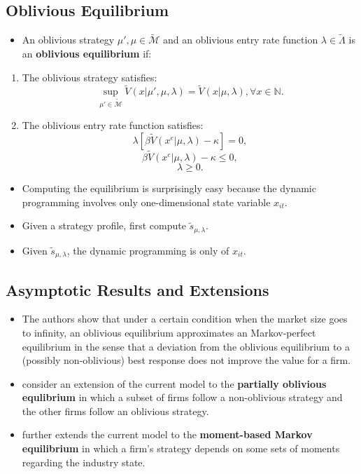 \documentclass[
]{book}
\providecommand{\tightlist}{%
  \setlength{\itemsep}{0pt}\setlength{\parskip}{0pt}}
\begin{document}
\hypertarget{oblivious-equilibrium}{%
\subsection{Oblivious Equilibrium}\label{oblivious-equilibrium}}

\begin{itemize}
\tightlist
\item
  An oblivious strategy \(\mu', \mu \in \widetilde{\mathcal{M}}\) and an oblivious entry rate function \(\lambda \in \widetilde{\Lambda}\) is an \textbf{oblivious equilibrium} if:
\end{itemize}

\begin{enumerate}
\def\labelenumi{\arabic{enumi}.}
\tightlist
\item
  The oblivious strategy satisfies:
  \[
  \sup_{\mu'  \in \widetilde{\mathcal{M}}} \widetilde{V}(x|\mu', \mu, \lambda) = \widetilde{V}(x|\mu, \lambda), \forall x \in \mathbb{N}.
  \]
\item
  The oblivious entry rate function satisfies:
  \[
  \lambda [\beta \widetilde{V}(x^e|\mu, \lambda) - \kappa] = 0,
  \]
  \[
  \beta \widetilde{V}(x^e|\mu, \lambda) - \kappa \le 0,
  \]
  \[
  \lambda \ge 0.
  \]
\end{enumerate}

\begin{itemize}
\tightlist
\item
  Computing the equilibrium is surprisingly easy because the dynamic programming involves only one-dimensional state variable \(x_{it}\).
\item
  Given a strategy profile, first compute \(\tilde{s}_{\mu, \lambda}\).
\item
  Given \(\tilde{s}_{\mu, \lambda}\), the dynamic programming is only of \(x_{it}\).
\end{itemize}

\hypertarget{asymptotic-results-and-extensions}{%
\subsection{Asymptotic Results and Extensions}\label{asymptotic-results-and-extensions}}

\begin{itemize}
\tightlist
\item
  The authors show that under a certain condition when the market size goes to infinity, an oblivious equilibrium approximates an Markov-perfect equilibrium in the sense that a deviation from the oblivious equilibrium to a (possibly non-oblivious) best response does not improve the value for a firm.
\item
  \citet{Benkard2015} consider an extension of the current model to the \textbf{partially oblivious equlibrium} in which a subset of firms follow a non-oblivious strategy and the other firms follow an oblivious strategy.
\item
  \citet{Ifrach2017} further extends the current model to the \textbf{moment-based Markov equilibrium} in which a firm's strategy depends on some sets of moments regarding the industry state.
\end{itemize}
\end{document}
